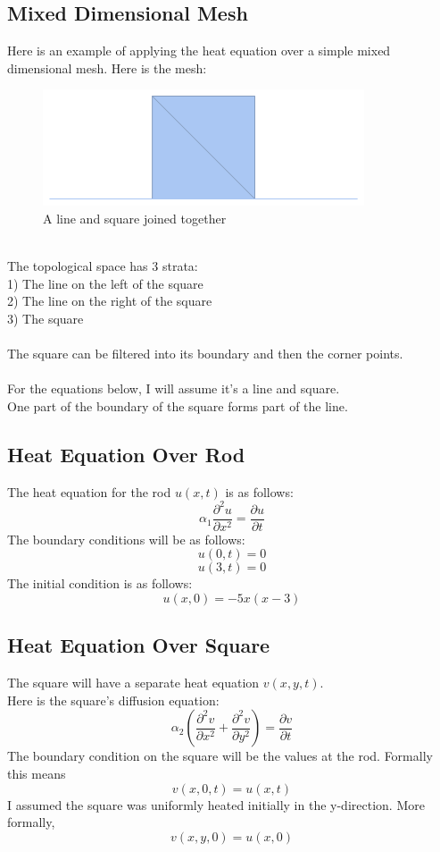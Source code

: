 \documentclass[twoside,11pt]{article}
\theoremstyle{definition}
\begin{document}
\subsection{Mixed Dimensional Mesh}

Here is an example of applying the heat equation over a simple mixed dimensional mesh. Here is the mesh:
\begin{figure}[h]
\centering
\includegraphics[width=3 in]{mixedMeshPic.png}
\caption{A line and square joined together}
\end{figure}
\\
The topological space has 3 strata: \\
1) The line on the left of the square\\
2) The line on the right of the square\\
3) The square\\
\\
The square can be filtered into its boundary and then the corner points.\\
\\
For the equations below, I will assume it's a line and square. \\
One part of the boundary of the square forms part of the line. 

\subsection{Heat Equation Over Rod}

The heat equation for the rod $u(x,t)$ is as follows:
\[
\alpha_1 \frac{\partial^2 u}{\partial x^2} = \frac{\partial u}{\partial t}
\]
The boundary conditions will be as follows:
\[
u(0,t)=0
\]
\[
u(3,t)=0
\]
The initial condition is as follows:
\[
u(x,0)=-5x(x-3)
\]

\subsection{Heat Equation Over Square}

The square will have a separate heat equation $v(x,y,t)$. \\
Here is the square's diffusion equation:
\[
\alpha_2 (\frac{\partial^2 v}{\partial x^2} + \frac{\partial^2 v}{\partial y^2}) = \frac{\partial v}{\partial t}
\]
The boundary condition on the square will be the values at the rod. Formally this means
\[
v(x,0,t)=u(x,t)
\]
I assumed the square was uniformly heated initially in the y-direction. More formally, 
\[
v(x,y,0)=u(x,0)
\]
\end{document}
